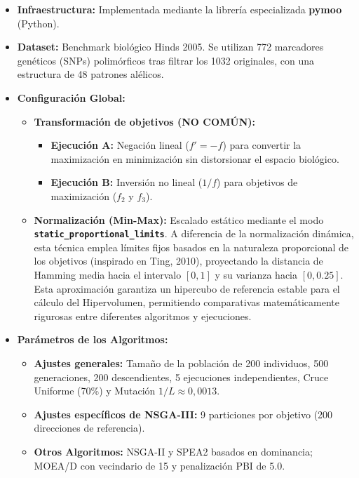 \documentclass[a4paper,10pt]{article}
\begin{document}
\begin{itemize}
    \item \textbf{Infraestructura:} Implementada mediante la librería especializada \textbf{pymoo} (Python).
    \item \textbf{Dataset:} Benchmark biológico Hinds 2005. Se utilizan 772 marcadores genéticos (SNPs) polimórficos tras filtrar los 1032 originales, con una estructura de 48 patrones alélicos.
    \item \textbf{Configuración Global:}
    \begin{itemize}
        \item \textbf{Transformación de objetivos (NO COMÚN):} 
        \begin{itemize}
            \item \textbf{Ejecución A:} Negación lineal ($f' = -f$) para convertir la maximización en minimización sin distorsionar el espacio biológico.
            \item \textbf{Ejecución B:} Inversión no lineal ($1/f$) para objetivos de maximización ($f_2$ y $f_3$).
        \end{itemize}
        \item \textbf{Normalización (Min-Max):} Escalado estático mediante el modo \textbf{\texttt{static\_proportional\_limits}}. A diferencia de la normalización dinámica, esta técnica emplea límites fijos basados en la naturaleza proporcional de los objetivos (inspirado en Ting, 2010), proyectando la distancia de Hamming media hacia el intervalo $[0, 1]$ y su varianza hacia $[0, \mbox{0.25}]$. Esta aproximación garantiza un hipercubo de referencia estable para el cálculo del Hipervolumen, permitiendo comparativas matemáticamente rigurosas entre diferentes algoritmos y ejecuciones.
    \end{itemize}
    \item \textbf{Parámetros de los Algoritmos:}
    \begin{itemize}
        \item \textbf{Ajustes generales:} Tamaño de la población de 200 individuos, 500 generaciones, 200 descendientes, 5 ejecuciones independientes, Cruce Uniforme (70\%) y Mutación $1/L \approx 0,0013$.
        \item \textbf{Ajustes específicos de NSGA-III:} 9 particiones por objetivo (200 direcciones de referencia).
        \item \textbf{Otros Algoritmos:} NSGA-II y SPEA2 basados en dominancia; MOEA/D con vecindario de 15 y penalización PBI de 5.0.
    \end{itemize}

\end{itemize}
\end{document}
